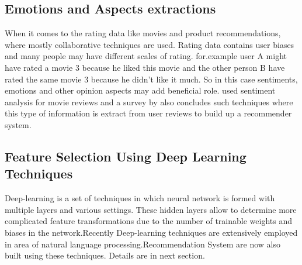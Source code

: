 \subsection{Emotions and Aspects extractions}
When it comes to the rating data like movies and product recommendations, where mostly collaborative techniques are used. Rating data contains user biases and many people may have different scales of rating. for.example user A might have rated a movie 3 because he liked this movie and the other person B have rated the same movie 3 because he didn't like it much. So in this case sentiments, emotions and other opinion aspects may add beneficial role.\cite{N72} used sentiment analysis for movie reviews and a survey by\cite{D7} also concludes such techniques where this type of information is extract from user reviews to build up a recommender system. 

\subsection{Feature Selection Using Deep Learning Techniques}
Deep-learning is a set of techniques in which neural network is formed with multiple layers and various settings. These hidden layers allow to determine more complicated feature transformations due to the number of trainable weights and biases in the network.Recently Deep-learning techniques are extensively employed in area of natural language processing.Recommendation System are now also built using these techniques. Details are in next section.



\\
\\